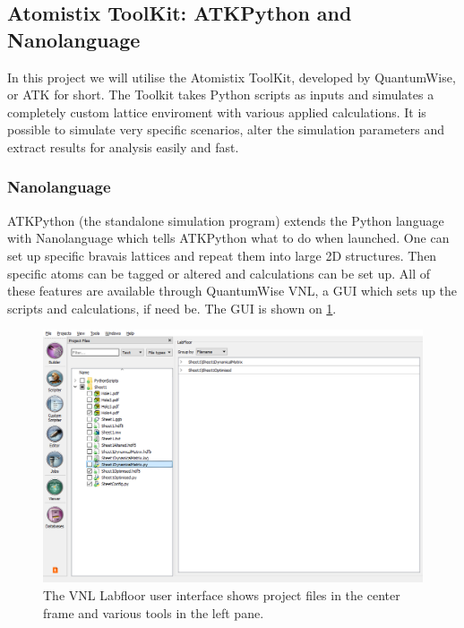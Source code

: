 
\subsection{Atomistix ToolKit: ATKPython and Nanolanguage}
In this project we will utilise the Atomistix ToolKit, developed by QuantumWise, or ATK for short. The Toolkit takes Python scripts as inputs and simulates a completely custom lattice enviroment with various applied calculations. It is possible to simulate very specific scenarios, alter the simulation parameters and extract results for analysis easily and fast.
\subsubsection{Nanolanguage}
ATKPython (the standalone simulation program) extends the Python language with Nanolanguage which tells ATKPython what to do when launched. One can set up specific bravais lattices and repeat them into large 2D structures. Then specific atoms can be tagged or altered and calculations can be set up. All of these features are available through QuantumWise VNL, a GUI which sets up the scripts and calculations, if need be. The GUI is shown on \cref{VNLLAB}.
\begin{figure}
 \centering
 \includegraphics[width=\columnwidth]{Figures/VNLLabfloor.png}
 \caption{The VNL Labfloor user interface shows project files in the center frame and various tools in the left pane.}
 \label{VNLLAB}
\end{figure}
